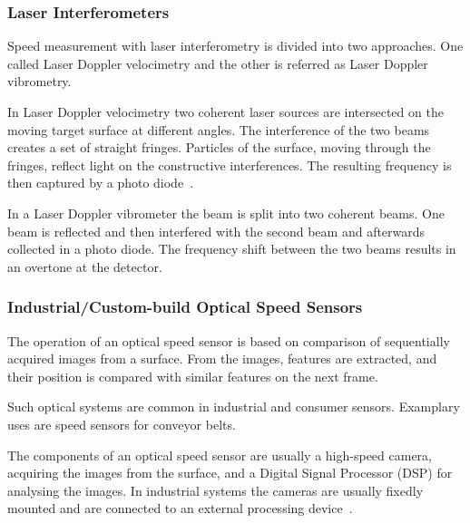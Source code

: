 \documentclass[12pt,a4paper]{article}
\begin{document}
\subsubsection{Laser Interferometers}

Speed measurement with laser interferometry is divided into two approaches.
One called Laser Doppler velocimetry and the other is referred as Laser Doppler vibrometry.

In Laser Doppler velocimetry two coherent laser sources are intersected on the moving target surface at different angles.
The interference of the two beams creates a set of straight fringes. 
Particles of the surface, moving through the fringes, reflect light on the constructive interferences.
The resulting frequency is then captured by a photo diode~\cite{laser_vel}.


In a Laser Doppler vibrometer the beam is split into two coherent beams.
One beam is reflected and then interfered with the second beam and afterwards collected in a photo diode. 
The frequency shift between the two beams results in an overtone at the detector.





\subsubsection{Industrial/Custom-build Optical Speed Sensors}

The operation of an optical speed sensor is based on comparison of sequentially acquired images from a surface.
From the images, features are extracted, and their position is compared with similar features on the next frame. 

Such optical systems are common in industrial and consumer sensors.
Examplary uses are speed sensors for conveyor belts.

The components of an optical speed sensor are usually a high-speed camera, acquiring the images from the surface, and a Digital Signal Processor (DSP) for analysing the images.
In industrial systems the cameras are usually fixedly mounted and are connected to an external processing device~\cite{opt_vel}.
\end{document}
